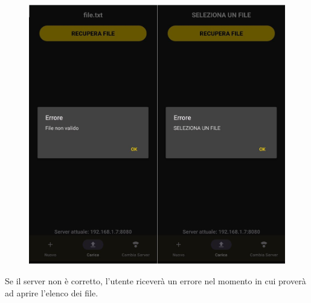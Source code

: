 \begin{enumerate}
  \begin{figure}[H]
    \centering
    \includegraphics[scale=0.35]{img/app9.png}
  \end{figure}
  Se il server non è corretto, l'utente riceverà un errore nel momento in cui proverà ad aprire l'elenco dei file.
  \begin{figure}[H]
    \centering

\end{figure}
\end{enumerate}
